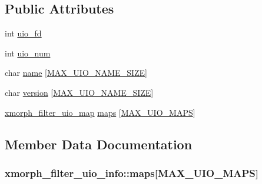 \subsection*{Public Attributes}
\begin{DoxyCompactItemize}
\item 
int \hyperlink{structxmorph__filter__uio__info_ac61f755f744e49006814f2a7542e80c6}{uio\+\_\+fd}
\item 
int \hyperlink{structxmorph__filter__uio__info_ad4f78bdfe803c26ef3801365c475d410}{uio\+\_\+num}
\item 
char \hyperlink{structxmorph__filter__uio__info_ad50f0ebca864e8164b94c25c79e36b28}{name} \mbox{[}\hyperlink{uio_8h_a5ed3f1c67d5551770a91ef53fe208c83}{M\+A\+X\+\_\+\+U\+I\+O\+\_\+\+N\+A\+M\+E\+\_\+\+S\+I\+ZE}\mbox{]}
\item 
char \hyperlink{structxmorph__filter__uio__info_af338637c0c32343f3cd6806949f1f822}{version} \mbox{[}\hyperlink{uio_8h_a5ed3f1c67d5551770a91ef53fe208c83}{M\+A\+X\+\_\+\+U\+I\+O\+\_\+\+N\+A\+M\+E\+\_\+\+S\+I\+ZE}\mbox{]}
\item 
\hyperlink{structxmorph__filter__uio__map}{xmorph\+\_\+filter\+\_\+uio\+\_\+map} \hyperlink{structxmorph__filter__uio__info_a4be1580d5c61c751dce585288b43a231}{maps} \mbox{[}\hyperlink{uio_8h_a05a77cb47b9d8cdaaee64df37627ffdc}{M\+A\+X\+\_\+\+U\+I\+O\+\_\+\+M\+A\+PS}\mbox{]}
\end{DoxyCompactItemize}


\subsection{Member Data Documentation}
\subsubsection[{\texorpdfstring{maps}{maps}}]{ xmorph\+\_\+filter\+\_\+uio\+\_\+info\+::maps\mbox{[}{\bf M\+A\+X\+\_\+\+U\+I\+O\+\_\+\+M\+A\+PS}\mbox{]}}\hypertarget{structxmorph__filter__uio__info_a4be1580d5c61c751dce585288b43a231}{}\label{structxmorph__filter__uio__info_a4be1580d5c61c751dce585288b43a231}
